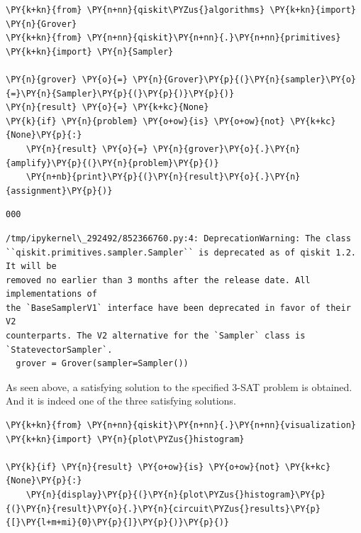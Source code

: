     \begin{tcolorbox}[breakable, size=fbox, boxrule=1pt, pad at break*=1mm,colback=cellbackground, colframe=cellborder]
\begin{Verbatim}[commandchars=\\\{\}]
\PY{k+kn}{from} \PY{n+nn}{qiskit\PYZus{}algorithms} \PY{k+kn}{import} \PY{n}{Grover}
\PY{k+kn}{from} \PY{n+nn}{qiskit}\PY{n+nn}{.}\PY{n+nn}{primitives} \PY{k+kn}{import} \PY{n}{Sampler}

\PY{n}{grover} \PY{o}{=} \PY{n}{Grover}\PY{p}{(}\PY{n}{sampler}\PY{o}{=}\PY{n}{Sampler}\PY{p}{(}\PY{p}{)}\PY{p}{)}
\PY{n}{result} \PY{o}{=} \PY{k+kc}{None}
\PY{k}{if} \PY{n}{problem} \PY{o+ow}{is} \PY{o+ow}{not} \PY{k+kc}{None}\PY{p}{:}
    \PY{n}{result} \PY{o}{=} \PY{n}{grover}\PY{o}{.}\PY{n}{amplify}\PY{p}{(}\PY{n}{problem}\PY{p}{)}
    \PY{n+nb}{print}\PY{p}{(}\PY{n}{result}\PY{o}{.}\PY{n}{assignment}\PY{p}{)}
\end{Verbatim}
\end{tcolorbox}

    \begin{Verbatim}[commandchars=\\\{\}]
000
    \end{Verbatim}

    \begin{Verbatim}[commandchars=\\\{\}]
/tmp/ipykernel\_292492/852366760.py:4: DeprecationWarning: The class
``qiskit.primitives.sampler.Sampler`` is deprecated as of qiskit 1.2. It will be
removed no earlier than 3 months after the release date. All implementations of
the `BaseSamplerV1` interface have been deprecated in favor of their V2
counterparts. The V2 alternative for the `Sampler` class is
`StatevectorSampler`.
  grover = Grover(sampler=Sampler())
    \end{Verbatim}

    As seen above, a satisfying solution to the specified 3-SAT problem is
obtained. And it is indeed one of the three satisfying solutions.

    \begin{tcolorbox}[breakable, size=fbox, boxrule=1pt, pad at break*=1mm,colback=cellbackground, colframe=cellborder]
\begin{Verbatim}[commandchars=\\\{\}]
\PY{k+kn}{from} \PY{n+nn}{qiskit}\PY{n+nn}{.}\PY{n+nn}{visualization} \PY{k+kn}{import} \PY{n}{plot\PYZus{}histogram}

\PY{k}{if} \PY{n}{result} \PY{o+ow}{is} \PY{o+ow}{not} \PY{k+kc}{None}\PY{p}{:}
    \PY{n}{display}\PY{p}{(}\PY{n}{plot\PYZus{}histogram}\PY{p}{(}\PY{n}{result}\PY{o}{.}\PY{n}{circuit\PYZus{}results}\PY{p}{[}\PY{l+m+mi}{0}\PY{p}{]}\PY{p}{)}\PY{p}{)}
\end{Verbatim}
\end{tcolorbox}

